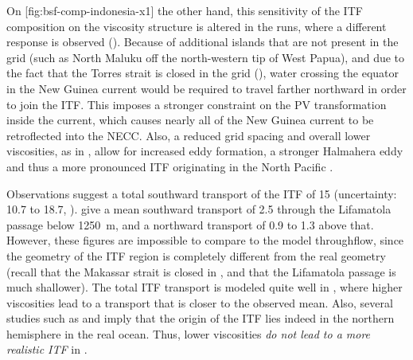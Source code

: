 On%
[fig:bsf-comp-indonesia-x1]%
{}%
the other hand, this sensitivity of the \ac{ITF} composition on the viscosity structure is altered in the  runs, where a different response is observed (). Because of additional islands that are not present in the  grid (such as North Maluku off the north-western tip of West Papua), and due to the fact that the Torres strait is closed in the  grid (\cite{meehl}), water crossing the equator in the New Guinea current would be required to travel farther northward in order to join the \ac{ITF}. This imposes a stronger constraint on the \ac{PV} transformation inside the current, which causes nearly all of the New Guinea current to be retroflected into the \ac{NECC}. Also, a reduced grid spacing and overall lower viscosities, as in , allow for increased eddy formation, \ie a stronger Halmahera eddy and thus a more pronounced \ac{ITF} originating in the North Pacific \citep{wajsowicz}. 

\parabreak

Observations suggest a total southward transport of the \ac{ITF} of \SI{15}{\sv} (uncertainty: \num{10.7} to \SI{18.7}{\sv}, \cite{sprintall}). \cite{vanAken} give a mean southward transport of \SI{2.5}{\sv} through the Lifamatola passage below \SI{1250}{\metre}, and a northward transport of \num{0.9} to \SI{1.3}{\sv} above that. However, these figures are impossible to compare to the  model throughflow, since the geometry of the \ac{ITF} region is completely different from the real geometry (recall that the Makassar strait is closed in , and that the Lifamatola passage is much shallower). The total \ac{ITF} transport is modeled quite well in , where higher viscosities lead to a transport that is closer to the observed mean.
Also, several studies such as \cite{gordon} and \cite{lukas} imply that the origin of the \ac{ITF} lies indeed in the northern hemisphere in the real ocean. Thus, lower viscosities \emph{do not lead to a more realistic \ac{ITF}} in .

\FloatBlock
\clearpage
